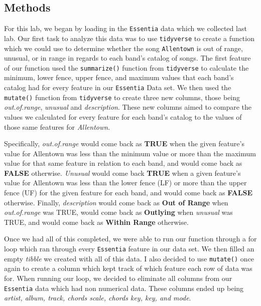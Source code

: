 \documentclass{article}\usepackage[]{graphicx}\usepackage[]{xcolor}
\begin{document}
\begin{multicols}{2}
\section{Methods}
For this lab, we began by loading in the \texttt{Essentia} \citep{Essentia} data which we collected last lab. Our first task to analyze this data was to use \texttt{tidyverse} \citep{tidyverse} to create a function which we could use to determine whether the song \texttt{Allentown} is out of range, unusual, or in range in regards to each band's catalog of songs. The first feature of our function used the \texttt{summarize()} function from \texttt{tidyverse} to calculate the minimum, lower fence, upper fence, and maximum values that each band's catalog had for every feature in our \texttt{Essentia} Data set. We then used the \texttt{mutate()} function from \texttt{tidyverse} to create three new columns, those being \textit{out.of.range}, \textit{unusual} and \textit{description}. These new columns aimed to compare the values we calculated for every feature for each band's catalog to the values of those same features for \textit{Allentown}. 
\par\indent
Specifically, \textit{out.of.range} would come back as \textbf{TRUE} when the given feature's value for Allentown was less than the minimum value or more than the maximum value for that same feature in relation to each band, and would come back as \textbf{FALSE} otherwise. \textit{Unusual} would come back \textbf{TRUE} when a given feature's value for Allentown was less than the lower fence (LF) or more than the upper fence (UF) for the given feature for each band, and would come back as \textbf{FALSE} otherwise. Finally, \textit{description} would come back as \textbf{Out of Range} when \textit{out.of.range} was TRUE, would come back as \textbf{Outlying} when \textit{unusual} was TRUE, and would come back as \textbf{Within Range} otherwise.
\par\indent
Once we had all of this completed, we were able to run our function through a for loop which ran through every \texttt{Essentia} feature in our data set. We then filled an empty \textit{tibble} we created with all of this data. I also decided to use \texttt{mutate()} once again to create a column which kept track of which feature each row of data was for. When running our loop, we decided to eliminate all columns from our \texttt{Essentia} data which had non numerical data. These columns ended up being \textit{artist, album, track, chords scale, chords key, key, and mode}.
\par\indent

\end{multicols}
\end{document}
